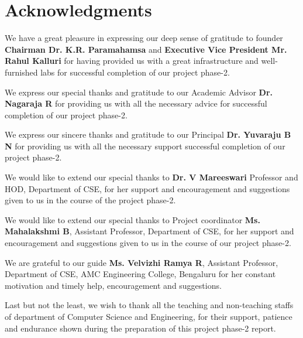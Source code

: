 \documentclass[a4paper, 12pt]{report}
\begin{document}
\setlength{\parindent}{0pt}


\chapter*{Acknowledgments}
\thispagestyle{borderedpage}
{}
We have a great pleasure in expressing our deep sense of gratitude to founder \textbf{Chairman Dr. K.R. Paramahamsa} and \textbf{Executive Vice President Mr. Rahul Kalluri} for having provided us with a great infrastructure and well-furnished labs for successful completion of our project phase-2.

\vspace{0.2cm}

We express our special thanks and gratitude to our Academic Advisor \textbf{Dr. Nagaraja R} for providing us with all the necessary advice for successful completion of our project phase-2.

\vspace{0.2cm}

We express our sincere thanks and gratitude to our Principal \textbf{Dr. Yuvaraju B N} for providing us with all the necessary support successful completion of our project phase-2.

\vspace{0.2cm}

We would like to extend our special thanks to \textbf{Dr. V Mareeswari} Professor and HOD, Department of CSE, for her support and encouragement and suggestions given to us in the course of the project phase-2.

\vspace{0.2cm}

We would like to extend our special thanks to Project coordinator  \textbf{Ms. Mahalakshmi B}, Assistant Professor, Department of CSE, for her support and encouragement and suggestions given to us in the course of our project phase-2.

\vspace{0.2cm}

We are grateful to our guide \textbf{Ms. Velvizhi Ramya R}, Assistant Professor, Department of CSE, AMC Engineering College, Bengaluru for her constant motivation and timely help, encouragement and suggestions.

\vspace{0.2cm}

Last but not the least, we wish to thank all the teaching and non-teaching staffs of department of Computer Science and Engineering, for their support, patience and endurance shown during the preparation of this project phase-2 report.
\end{document}
